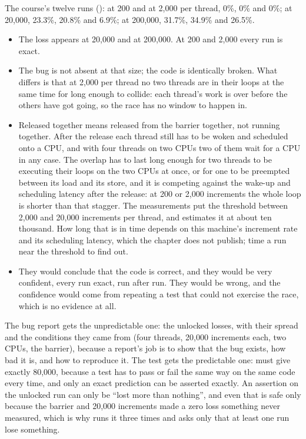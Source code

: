  The course's twelve runs (): at 200 and at 2,000 per thread, 0\%, 0\%
and 0\%; at 20,000, 23.3\%, 20.8\% and 6.9\%; at 200,000, 31.7\%, 34.9\% and 26.5\%.
\begin{itemize}
  \item The loss appears at 20,000 and at 200,000. At 200 and 2,000 every run is exact.
  \item The bug is not absent at that size; the code is identically broken. What differs is that at
    2,000 per thread no two threads are in their loops at the same time for long enough to collide:
    each thread's work is over before the others have got going, so the race has no window to
    happen in.
  \item Released together means released from the barrier together, not running together. After the
    release each thread still has to be woken and scheduled onto a CPU, and with four threads on two
    CPUs two of them wait for a CPU in any case. The overlap has to last long enough for two threads
    to be executing their loops on the two CPUs at once, or for one to be preempted between its load
    and its store, and it is competing against the wake-up and scheduling latency after the release:
    at 200 or 2,000 increments the whole loop is shorter than that stagger. The measurements put the
    threshold between 2,000 and 20,000 increments per thread, and  estimates it
    at about ten thousand. How long that is in time depends on this machine's increment rate and its
    scheduling latency, which the chapter does not publish; time a run near the threshold to find
    out.
  \item They would conclude that the code is correct, and they would be very confident, every run
    exact, run after run. They would be wrong, and the confidence would come from repeating a test
    that could not exercise the race, which is no evidence at all.
\end{itemize}

 The bug report gets the unpredictable one: the unlocked losses, with their spread and
the conditions they came from (four threads, 20,000 increments each, two CPUs, the barrier),
because a report's job is to show that the bug exists, how bad it is, and how to reproduce it. The
test gets the predictable one:  must give exactly 80,000, because a test has to pass
or fail the same way on the same code every time, and only an exact prediction can be asserted
exactly. An assertion on the unlocked run can only be ``lost more than nothing'', and even that is
safe only because the barrier and 20,000 increments made a zero loss something never measured,
which is why  runs it three times and asks only that at least one run lose something.

